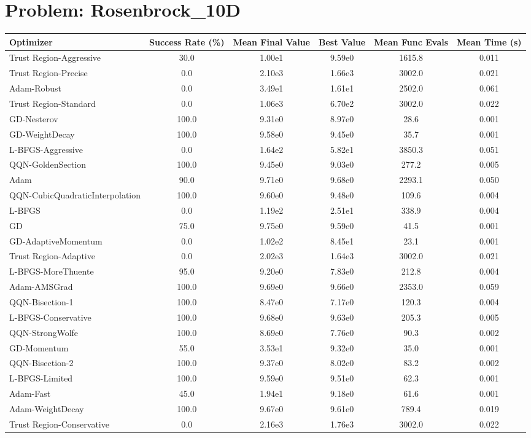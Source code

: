 \documentclass{article}
\begin{document}
\section{Problem: Rosenbrock\_10D}
\begin{longtable}{p{3cm}*{5}{c}}
\toprule
\textbf{Optimizer} & \textbf{Success Rate (\%)} & \textbf{Mean Final Value} & \textbf{Best Value} & \textbf{Mean Func Evals} & \textbf{Mean Time (s)} \\
\midrule
Trust Region-Aggressive & 30.0 & 1.00e1 & 9.59e0 & 1615.8 & 0.011 \\
Trust Region-Precise & 0.0 & 2.10e3 & 1.66e3 & 3002.0 & 0.021 \\
Adam-Robust & 0.0 & 3.49e1 & 1.61e1 & 2502.0 & 0.061 \\
Trust Region-Standard & 0.0 & 1.06e3 & 6.70e2 & 3002.0 & 0.022 \\
GD-Nesterov & 100.0 & 9.31e0 & 8.97e0 & 28.6 & 0.001 \\
GD-WeightDecay & 100.0 & 9.58e0 & 9.45e0 & 35.7 & 0.001 \\
L-BFGS-Aggressive & 0.0 & 1.64e2 & 5.82e1 & 3850.3 & 0.051 \\
QQN-GoldenSection & 100.0 & 9.45e0 & 9.03e0 & 277.2 & 0.005 \\
Adam & 90.0 & 9.71e0 & 9.68e0 & 2293.1 & 0.050 \\
QQN-CubicQuadraticInterpolation & 100.0 & 9.60e0 & 9.48e0 & 109.6 & 0.004 \\
L-BFGS & 0.0 & 1.19e2 & 2.51e1 & 338.9 & 0.004 \\
GD & 75.0 & 9.75e0 & 9.59e0 & 41.5 & 0.001 \\
GD-AdaptiveMomentum & 0.0 & 1.02e2 & 8.45e1 & 23.1 & 0.001 \\
Trust Region-Adaptive & 0.0 & 2.02e3 & 1.64e3 & 3002.0 & 0.021 \\
L-BFGS-MoreThuente & 95.0 & 9.20e0 & 7.83e0 & 212.8 & 0.004 \\
Adam-AMSGrad & 100.0 & 9.69e0 & 9.66e0 & 2353.0 & 0.059 \\
QQN-Bisection-1 & 100.0 & 8.47e0 & 7.17e0 & 120.3 & 0.004 \\
L-BFGS-Conservative & 100.0 & 9.68e0 & 9.63e0 & 205.3 & 0.005 \\
QQN-StrongWolfe & 100.0 & 8.69e0 & 7.76e0 & 90.3 & 0.002 \\
GD-Momentum & 55.0 & 3.53e1 & 9.32e0 & 35.0 & 0.001 \\
QQN-Bisection-2 & 100.0 & 9.37e0 & 8.02e0 & 83.2 & 0.002 \\
L-BFGS-Limited & 100.0 & 9.59e0 & 9.51e0 & 62.3 & 0.001 \\
Adam-Fast & 45.0 & 1.94e1 & 9.18e0 & 61.6 & 0.001 \\
Adam-WeightDecay & 100.0 & 9.67e0 & 9.61e0 & 789.4 & 0.019 \\
Trust Region-Conservative & 0.0 & 2.16e3 & 1.76e3 & 3002.0 & 0.022 \\
\bottomrule
\end{longtable}
\end{document}
